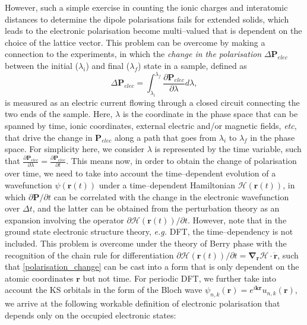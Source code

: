 However, such a simple exercise in counting the ionic charges and interatomic distances to determine the dipole polarisations fails for extended solids,\citep{spaldin2012beginner} which leads to the electronic polarisation become multi--valued that is dependent on the choice of the lattice vector. This problem can be overcome by making a connection to the experiments, in which the \emph{change in the polarisation} $\Delta\mathbf{P}_{elec}$ between the initial  ($\lambda_i$) and final ($\lambda_f$) state in a sample, defined as\cite{resta1992theory}
\begin{equation}\label{polarisation_change}
\Delta\mathbf{P}_{elec}=\int_{\lambda_i}^{\lambda_f}\frac{\partial \mathbf{P}_{elec}}{\partial \lambda}d\lambda,
\end{equation}
is measured as an electric current flowing through a closed circuit connecting the two ends of the sample. Here, $\lambda$ is the coordinate in the phase space that can be spanned by time, ionic coordinates, external electric and/or magnetic fields, \emph{etc}, that drive the change in $\mathbf{P}_{elec}$ along a path that goes from $\lambda_i$ to $\lambda_f$ in the phase space. For simplicity here, we consider $\lambda$ is represented by the time variable, such that $\frac{\partial \mathbf{P}_{elec}}{\partial \lambda}=\frac{\partial \mathbf{P}_{elec}}{\partial t}$. This means now, in order to obtain the change of polarisation over time, we need to take into account the time--dependent evolution of a wavefunction $\psi(\bm{r}(t))$ under a time--dependent Hamiltonian $\mathcal{H}(\bm{r}(t))$, in which $\partial \bm{P}/\partial t$ can be correlated with the change in the electronic wavefunction over $\Delta t$, and the latter can be obtained from the perturbation theory as an expansion involving the operator $\partial \mathcal{H}(\bm{r}(t))/\partial t$. However, note that in the ground state electronic structure theory, \emph{e.g.} DFT, the time--dependency is not included. This problem is overcome under the theory of Berry phase with the recognition of the chain rule for differentiation $\partial \mathcal{H}(\bm{r}(t))/\partial t=\bm{\nabla}_{\bm{r}}\mathcal{H}\cdot\dot{\bm{r}}$, such that \cref{polarisation_change} can be cast into a form that is  only dependent on the atomic coordinates $\bm{r}$ but not time. For periodic DFT, we further take into account the KS orbitals in the form of the Bloch wave $\psi_{n,k}(\bm{r})=e^{i\bm{k}\bm{r}}u_{n,k}(\bm{r})$, we arrive at the  following workable definition of electronic polarisation that depends only on the occupied electronic states:
